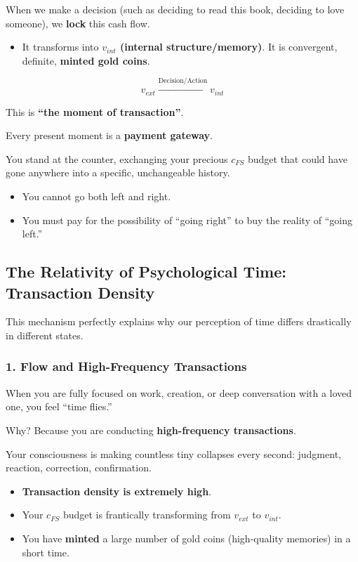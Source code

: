 When we make a decision (such as deciding to read this book, deciding to love someone), we \textbf{lock} this cash flow.

\begin{itemize}
\item It transforms into \textbf{$v_{int}$ (internal structure/memory)}. It is convergent, definite, \textbf{minted gold coins}.
\end{itemize}

\[v_{ext} \xrightarrow{\text{Decision/Action}} v_{int}\]

This is \textbf{``the moment of transaction''}.

Every present moment is a \textbf{payment gateway}.

You stand at the counter, exchanging your precious $c_{FS}$ budget that could have gone anywhere into a specific, unchangeable history.

\begin{itemize}
\item You cannot go both left and right.

\item You must pay for the possibility of ``going right'' to buy the reality of ``going left.''
\end{itemize}

\subsection{The Relativity of Psychological Time: Transaction Density}

This mechanism perfectly explains why our perception of time differs drastically in different states.

\subsubsection{1. Flow and High-Frequency Transactions}

When you are fully focused on work, creation, or deep conversation with a loved one, you feel ``time flies.''

Why? Because you are conducting \textbf{high-frequency transactions}.

Your consciousness is making countless tiny collapses every second: judgment, reaction, correction, confirmation.

\begin{itemize}
\item \textbf{Transaction density is extremely high}.

\item Your $c_{FS}$ budget is frantically transforming from $v_{ext}$ to $v_{int}$.

\item You have \textbf{minted} a large number of gold coins (high-quality memories) in a short time.
\end{itemize}

